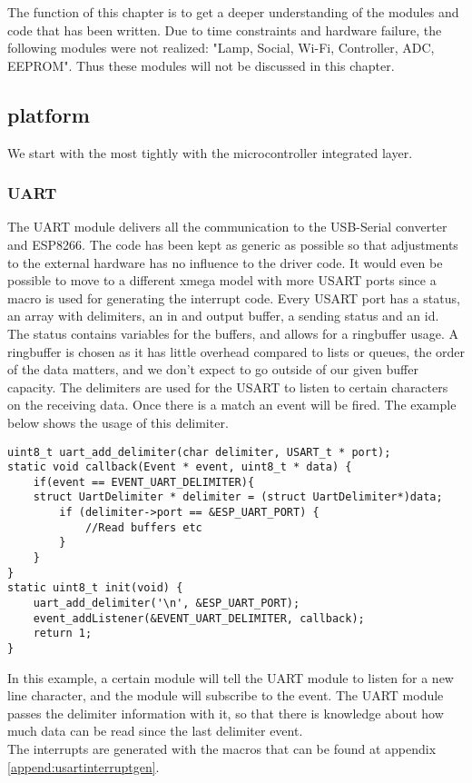 The function of this chapter is to get a deeper understanding of the modules and code that has been written. Due to time constraints and hardware failure, the following modules were not realized: "Lamp, Social, Wi-Fi, Controller, ADC, EEPROM". Thus these modules will not be discussed in this chapter. 
\subsection{platform}
We start with the most tightly with the microcontroller integrated layer.
\subsubsection{UART}
The UART module delivers all the communication to the USB-Serial converter and ESP8266. The code has been kept as generic as possible so that adjustments to the external hardware has no influence to the driver code. It would even be possible to move to a different xmega model with more USART ports since a macro is used for generating the interrupt code. Every USART port has a status, an array with delimiters, an in and output buffer, a sending status and an id. The status contains variables for the buffers, and allows for a ringbuffer usage. A ringbuffer is chosen as it has little overhead compared to lists or queues, the order of the data matters, and we don't expect to go outside of our given buffer capacity. The delimiters are used for the USART to listen to certain characters on the receiving data. Once there is a match an event will be fired. The example below shows the usage of this delimiter.
\begin{verbatim}
uint8_t uart_add_delimiter(char delimiter, USART_t * port);
static void callback(Event * event, uint8_t * data) {
	if(event == EVENT_UART_DELIMITER){
	struct UartDelimiter * delimiter = (struct UartDelimiter*)data;
		if (delimiter->port == &ESP_UART_PORT) {
			//Read buffers etc
		}
	}
}
static uint8_t init(void) {
	uart_add_delimiter('\n', &ESP_UART_PORT);
	event_addListener(&EVENT_UART_DELIMITER, callback);
	return 1;
}
\end{verbatim}
In this example, a certain module will tell the UART module to listen for a new line character, and the module will subscribe to the event. The UART module passes the delimiter information with it, so that there is knowledge about how much data can be read since the last delimiter event.\\ 
The interrupts are generated with the macros that can be found at appendix \ref{append:usartinterruptgen}.

